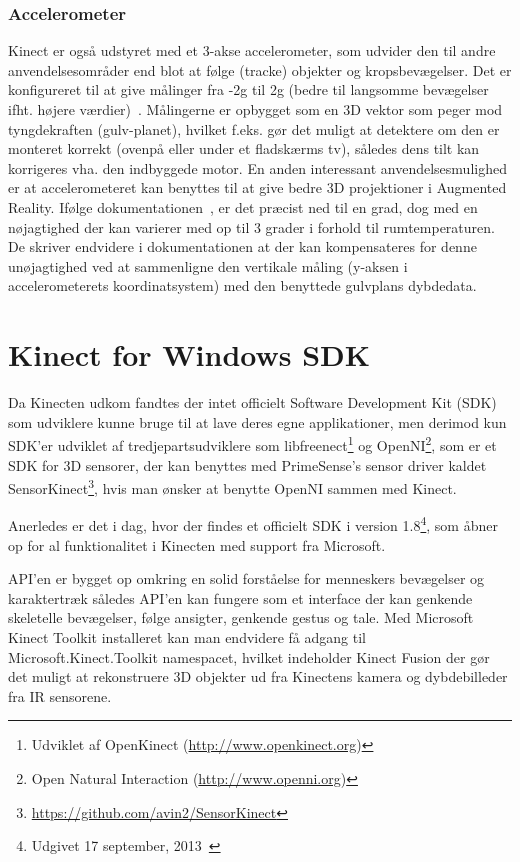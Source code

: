 \subsubsection{Accelerometer}
Kinect er også udstyret med et 3-akse accelerometer, som udvider den til andre anvendelsesområder end blot at følge (tracke) objekter og kropsbevægelser.
Det er konfigureret til at give målinger fra -2g til 2g (bedre til langsomme bevægelser ifht. højere værdier)~\cite{kinectAccelerometer}.
Målingerne  er opbygget som en 3D vektor som peger mod tyngdekraften (gulv-planet), hvilket f.eks. gør det muligt at detektere om den er monteret korrekt (ovenpå eller under et fladskærms tv), således dens tilt kan korrigeres vha. den indbyggede motor.
En anden interessant anvendelsesmulighed er at accelerometeret kan benyttes til at give bedre 3D projektioner i Augmented Reality.
Ifølge dokumentationen~\cite{kinectDocAccelerometer}, er det præcist ned til en grad, dog med en nøjagtighed der kan varierer med op til 3 grader i forhold til rumtemperaturen.
De skriver endvidere i dokumentationen at der kan kompensateres for denne unøjagtighed ved at sammenligne den vertikale måling (y-aksen i accelerometerets koordinatsystem) med den benyttede gulvplans dybdedata.


\section{Kinect for Windows SDK}
Da Kinecten udkom fandtes der intet officielt Software Development Kit (SDK) som udviklere kunne bruge til at lave deres egne applikationer, men derimod kun SDK'er udviklet af tredjepartsudviklere som libfreenect\footnote{Udviklet af OpenKinect (\url{http://www.openkinect.org})} og OpenNI\footnote{Open Natural Interaction (\url{http://www.openni.org})}, som er et SDK for 3D sensorer, der kan benyttes med PrimeSense's sensor driver kaldet SensorKinect\footnote{\url{https://github.com/avin2/SensorKinect}}, hvis man ønsker at benytte OpenNI sammen med Kinect.


Anerledes er det i dag, hvor der findes et officielt SDK i version 1.8\footnote{Udgivet 17 september, 2013~\cite{kinectSDK18}}, som åbner op for al funktionalitet i Kinecten med support fra Microsoft.

API'en er bygget op omkring en solid forståelse for menneskers bevægelser og karaktertræk således API'en kan fungere som et interface der kan genkende skeletelle bevægelser, følge ansigter, genkende gestus og tale.
Med Microsoft Kinect Toolkit installeret kan man endvidere få adgang til Microsoft.Kinect.Toolkit namespacet, hvilket indeholder Kinect Fusion der gør det muligt at rekonstruere 3D objekter ud fra Kinectens kamera og dybdebilleder fra IR sensorene.~\cite{kinectForWindowsFeatures}


